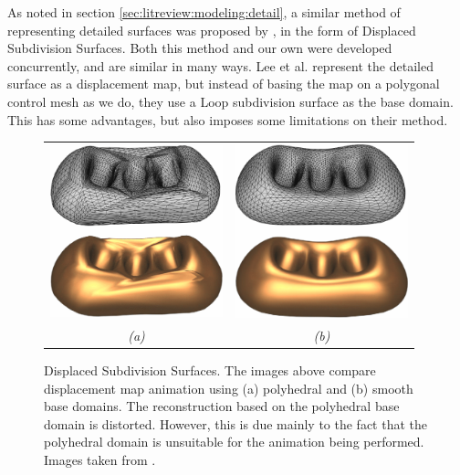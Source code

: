 As noted in section \ref{sec:litreview:modeling:detail}, a similar method of representing detailed surfaces was proposed by \citet{Lee00}, in the form of Displaced Subdivision Surfaces. Both this method and our own were developed concurrently, and are similar in many ways. Lee et al. represent the detailed surface as a displacement map, but instead of basing the map on a polygonal control mesh as we do, they use a Loop subdivision surface \cite{Loop94} as the base domain. This has some advantages, but also imposes some limitations on their method.

\begin{figure}
\begin{center}
\begin{tabular}{cc}
\includegraphics[width=5cm]{../images/lee_poly} &
\includegraphics[width=5cm]{../images/lee_subdiv} \\
{\it(a)} & {\it(b)}
\end{tabular}
\caption[Displaced Subdivision Surfaces]{\label{fig:dispsubdiv} Displaced Subdivision Surfaces. The images above compare displacement map animation using (a) polyhedral and (b) smooth base domains. The reconstruction based on the polyhedral base domain is distorted. However, this is due mainly to the fact that the polyhedral domain is unsuitable for the animation being performed. Images taken from \cite{Lee00}.}
\end{center}
\end{figure}
